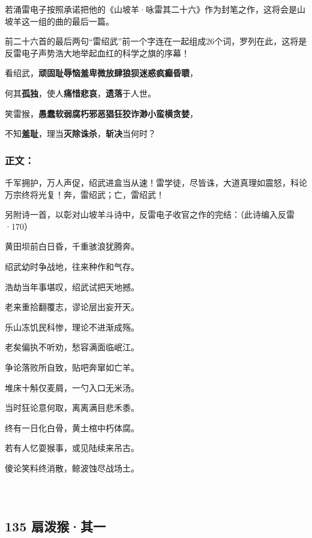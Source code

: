 若涌雷电子按照承诺把他的《山坡羊·咏雷其二十六》作为封笔之作，这将会是山坡羊这一组的曲的最后一篇。

前二十六首的最后两句``雷绍武''前一个字连在一起组成26个词，罗列在此，这将是反雷电子声势浩大地举起血红的科学之旗的序幕！

看绍武，\textbf{顽固耻辱恼羞卑微放肆狼狈迷惑疯癫昏聩}，

何其\textbf{孤独}，使人\textbf{痛惜悲哀}，\textbf{遗落}于人世。

笑雷猴，\textbf{愚蠢软弱腐朽邪恶猖狂狡诈渺小蛮横贪婪}，

不知\textbf{羞耻}，理当\textbf{灭除诛杀}，\textbf{斩决}当何时？

\hypertarget{ux6b63ux6587}{%
\subsubsection{正文：}\label{ux6b63ux6587}}

千军拥护，万人声促，绍武进盒当从速！雷学徒，尽皆诛，大道真理如震怒，科论万宗终将光复！奔，雷绍武；亡，雷绍武！

另附诗一首，以彰对山坡羊斗诗中，反雷电子收官之作的完结：（此诗编入反雷·170）

黄田坝前白日昏，千重骇浪犹腾奔。

绍武幼时争战地，往来种作和气存。

浩劫当年事堪叹，绍武试把天地撼。

老来重拾翻覆志，谬论层出妄开天。

乐山冻饥民科惨，理论不进渐成殇。

老矣偏执不听劝，愁容满面临岷江。

争论落败所自致，贴吧奔窜如亡羊。

堆床十斛仅麦屑，一勺入口无米汤。

当时狂论意何取，离离满目悲禾黍。

终有一日化白骨，黄土棺中朽体腐。

若有人忆耍猴事，或见陆续来吊古。

傻论笑料终消散，鲸波蚀尽战场土。

~\\

\hypertarget{section-1}{%
\section{}\label{section-1}}

\hypertarget{ux6247ux6cfcux7334ux5176ux4e00}{%
\subsection{135 扇泼猴·其一}\label{ux6247ux6cfcux7334ux5176ux4e00}}

